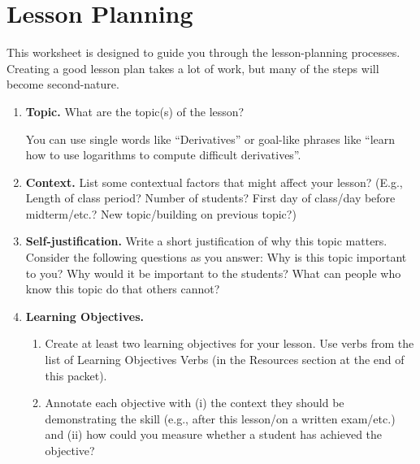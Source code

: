 \documentclass{book}
\begin{document}





\renewcommand{\headrulewidth}{0pt}
\pagestyle{fancy}
\section*{Lesson Planning}

This worksheet is designed to guide you through the lesson-planning processes. Creating a good lesson
plan takes a lot of work, but many of the steps will become second-nature.

\begin{enumerate}
	\item \textbf{Topic.} What are the topic(s) of the lesson?

		You can use single words like ``Derivatives'' or goal-like phrases like ``learn how to use logarithms
		to compute difficult derivatives''.

	\item \textbf{Context.} List some contextual factors that might
		affect your lesson? (E.g., Length of class period? Number of
		students? First day of class/day before midterm/etc.? New
		topic/building on previous topic?)

	\item \textbf{Self-justification.} Write a short justification
	of why this topic matters. Consider the following questions as
	you answer: Why is this topic important to you? Why would it be
	important to the students? What can people who know this topic
	do that others cannot?
	\newpage

	\item \textbf{Learning Objectives.} 
		\begin{enumerate}
			\item Create at least two learning objectives for your lesson.
				Use verbs from the list of Learning Objectives Verbs (in the Resources section at the end of this packet).

			\item Annotate each objective with (i) the context
			they should be demonstrating the skill (e.g.,
			after this lesson/on a written exam/etc.) and
			(ii) how could you measure whether a student
			has achieved the objective?


\end{enumerate}
\end{enumerate}
\end{document}
